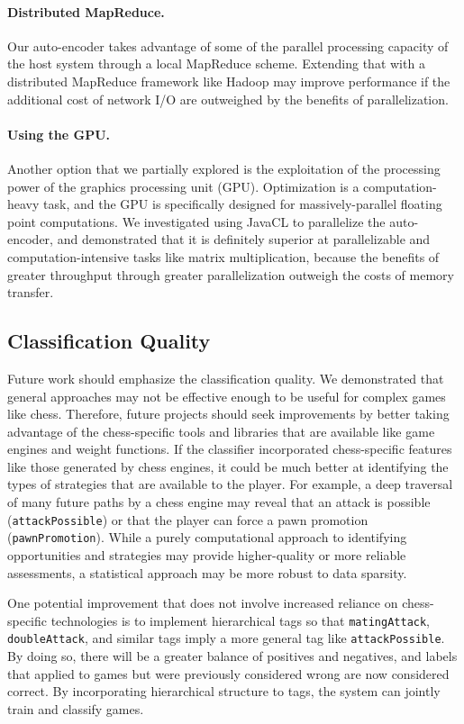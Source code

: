 \documentclass[11pt]{article}
\begin{document}
\paragraph{Distributed MapReduce.}
Our auto-encoder takes advantage of some of the parallel processing capacity of the host system through a local MapReduce scheme. Extending that with a distributed MapReduce framework like Hadoop may improve performance if the additional cost of network I/O are outweighed by the benefits of parallelization.

\paragraph{Using the GPU.}
Another option that we partially explored is the exploitation of the processing power of the graphics processing unit (GPU). Optimization is a computation-heavy task, and the GPU is specifically designed for massively-parallel floating point computations. We investigated using JavaCL to parallelize the auto-encoder, and demonstrated that it is definitely superior at parallelizable and computation-intensive tasks like matrix multiplication, because the benefits of greater throughput through greater parallelization outweigh the costs of memory transfer.

\subsection{Classification Quality}
Future work should emphasize the classification quality. We demonstrated that general approaches may not be effective enough to be useful for complex games like chess. Therefore, future projects should seek improvements by better taking advantage of the chess-specific tools and libraries that are available like game engines and weight functions. If the classifier incorporated chess-specific features like those generated by chess engines, it could be much better at identifying the types of strategies that are available to the player. For example, a deep traversal of many future paths by a chess engine may reveal that an attack is possible ({\tt attackPossible}) or that the player can force a pawn promotion ({\tt pawnPromotion}). While a purely computational approach to identifying opportunities and strategies may provide higher-quality or more reliable assessments, a statistical approach may be more robust to data sparsity.

One potential improvement that does not involve increased reliance on chess-specific technologies is to implement hierarchical tags so that {\tt matingAttack}, {\tt doubleAttack}, and similar tags imply a more general tag like {\tt attackPossible}. By doing so, there will be a greater balance of positives and negatives, and labels that applied to games but were previously considered wrong are now considered correct. By incorporating hierarchical structure to tags, the system can jointly train and classify games.
\end{document}
